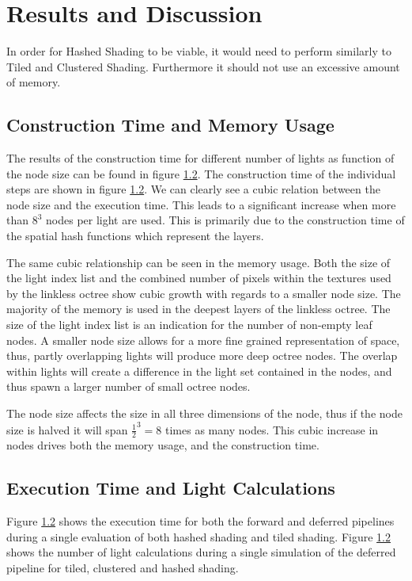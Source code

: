 \section{Results and Discussion}

In order for Hashed Shading to be viable, it would need to perform similarly to
Tiled and Clustered Shading. Furthermore it should not use an excessive amount
of memory. 


\subsection{Construction Time and Memory Usage}

The results of the construction time for different number of lights as function of the
node size can be found in figure \ref{}. The construction time of the individual steps
are shown in figure \ref{}. We can clearly see a cubic relation between the node size
and the execution time. This leads to a significant increase when more than $8^3$ nodes per
light are used. This is primarily due to the construction time of the spatial hash functions
which represent the layers.

The same cubic relationship can be seen in the memory usage. Both the size of the light index
list and the combined number of pixels within the textures used by the linkless octree show
cubic growth with regards to a smaller node size. The majority of the memory is used in
the deepest layers of the linkless octree. The size of the light index list is an indication
for the number of non-empty leaf nodes. A smaller node size allows for a more fine grained
representation of space, thus, partly overlapping lights will produce more deep octree nodes.
The overlap within lights will create a difference in the light set contained in the nodes,
and thus spawn a larger number of small octree nodes.

The node size affects the size in all three dimensions of the node, thus if the node size
is halved it will span $\frac{1}{2}^3 = 8$ times as many nodes. This cubic increase in
nodes drives both the memory usage, and the construction time.

\subsection{Execution Time and Light Calculations}

Figure \ref{} shows the execution time for both the forward and deferred pipelines during
a single evaluation of both hashed shading and tiled shading. Figure \ref{} shows the
number of light calculations during a single simulation of the deferred pipeline for
tiled, clustered and hashed shading.

